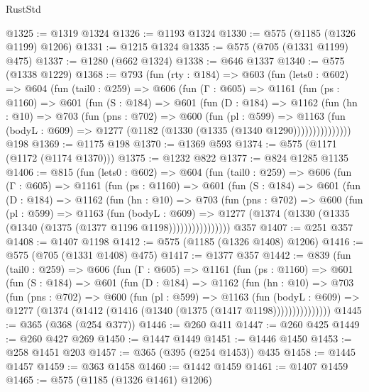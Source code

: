 \begin{lexlean}{RustStd}
\begin{coremodule}
@1325 := @1319 @1324
@1326 := @1193 @1324
@1330 := @575 (@1185 (@1326 @1199) @1206)
@1331 := @1215 @1324
@1335 := @575 (@705 (@1331 @1199) @475)
@1337 := @1280 (@662 @1324)
@1338 := @646 @1337
@1340 := @575 (@1338 @1229)
@1368 := @793
    (fun (rty : @184) =>
    @603
      (fun (lets0 : @602) =>
      @604
        (fun (tail0 : @259) =>
        @606
          (fun (Γ : @605) =>
          @1161
            (fun (ps : @1160) =>
            @601
              (fun (S : @184) =>
              @601
                (fun (D : @184) =>
                @1162
                  (fun (hn : @10) =>
                  @703
                    (fun (pns : @702) =>
                    @600
                      (fun (pl : @599) =>
                      @1163
                        (fun (bodyL : @609) =>
                        @1277 (@1182 (@1330 (@1335 (@1340 @1290)))))))))))))))
    @198
@1369 := @1175 @198
@1370 := @1369 @593
@1374 := @575 (@1171 (@1172 (@1174 @1370)))
@1375 := @1232 @822
@1377 := @824 @1285 @1135
@1406 := @815
    (fun (lets0 : @602) =>
    @604
      (fun (tail0 : @259) =>
      @606
        (fun (Γ : @605) =>
        @1161
          (fun (ps : @1160) =>
          @601
            (fun (S : @184) =>
            @601
              (fun (D : @184) =>
              @1162
                (fun (hn : @10) =>
                @703
                  (fun (pns : @702) =>
                  @600
                    (fun (pl : @599) =>
                    @1163
                      (fun (bodyL : @609) =>
                      @1277 (@1374 (@1330 (@1335 (@1340 (@1375 (@1377 @1196 @1198))))))))))))))))
    @357
@1407 := @251 @357
@1408 := @1407 @1198
@1412 := @575 (@1185 (@1326 @1408) @1206)
@1416 := @575 (@705 (@1331 @1408) @475)
@1417 := @1377 @357
@1442 := @839
    (fun (tail0 : @259) =>
    @606
      (fun (Γ : @605) =>
      @1161
        (fun (ps : @1160) =>
        @601
          (fun (S : @184) =>
          @601
            (fun (D : @184) =>
            @1162
              (fun (hn : @10) =>
              @703
                (fun (pns : @702) =>
                @600
                  (fun (pl : @599) =>
                  @1163
                    (fun (bodyL : @609) =>
                    @1277 (@1374 (@1412 (@1416 (@1340 (@1375 (@1417 @1198)))))))))))))))
@1445 := @365 (@368 (@254 @377))
@1446 := @260 @411
@1447 := @260 @425
@1449 := @260 @427 @269
@1450 := @1447 @1449
@1451 := @1446 @1450
@1453 := @258 @1451 @203
@1457 := @365 (@395 (@254 @1453)) @435
@1458 := @1445 @1457
@1459 := @363 @1458
@1460 := @1442 @1459
@1461 := @1407 @1459
@1465 := @575 (@1185 (@1326 @1461) @1206)

\end{coremodule}
\end{lexlean}
